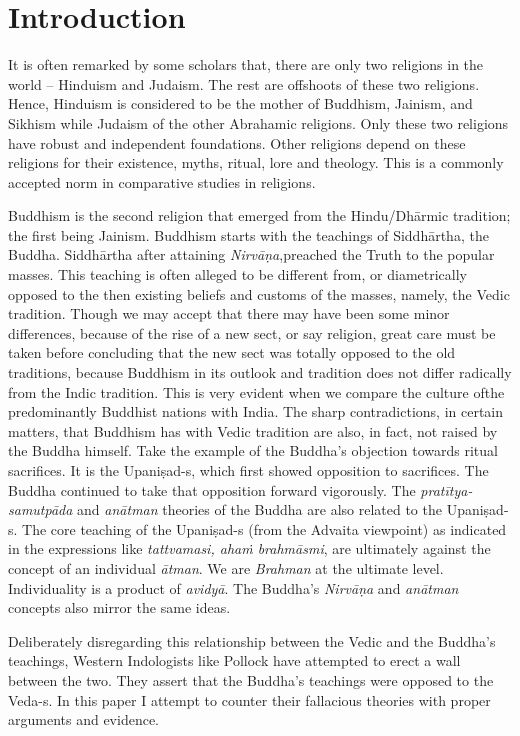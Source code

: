 \section*{Introduction}

It is often remarked by some scholars that, there are only two religions in the world – Hinduism and Judaism. The rest are offshoots of these two religions. Hence, Hinduism is considered to be the mother of Buddhism, Jainism, and Sikhism while Judaism of the other Abrahamic religions. Only these two religions have robust and independent foundations. Other religions depend on these religions for their existence, myths, ritual, lore and theology. This is a commonly accepted norm in comparative studies in religions.

Buddhism is the second religion that emerged from the Hindu/Dhārmic tradition; the first being Jainism. Buddhism starts with the teachings of Siddhārtha, the Buddha. Siddhārtha after attaining \textit{Nirvāṇa},\break preached the Truth to the popular masses. This teaching is often alleged to be different from, or diametrically opposed to the then existing beliefs and customs of the masses, namely, the Vedic tradition. Though we may accept that there may have been some minor differences, because of the rise of a new sect, or say religion, great care must be taken before concluding that the new sect was totally opposed to the old traditions, because Buddhism in its outlook and tradition does not differ radically from the Indic tradition. This is very evident when we compare the culture ofthe predominantly Buddhist nations with India. The sharp contradictions, in certain matters, that Buddhism has with Vedic tradition are also, in fact, not raised by the Buddha himself. Take the example of the Buddha’s objection towards ritual sacrifices. It is the Upaniṣad-s, which first showed opposition to sacrifices. The Buddha continued to take that opposition forward vigorously. The \textit{pratītya-samutpāda} and \textit{anātman} theories of the Buddha are also related to the Upaniṣad-s. The core teaching of the Upaniṣad-s (from the Advaita viewpoint) as indicated in the expressions like \textit{tattvamasi, ahaṁ brahmāsmi}, are ultimately against the concept of an individual \textit{ātman}. We are \textit{Brahman} at the ultimate level. Individuality is a product of \textit{avidyā}. The Buddha’s \textit{Nirvāṇa} and \textit{anātman} concepts also mirror the same ideas.

Deliberately disregarding this relationship between the Vedic and the Buddha’s teachings, Western Indologists like Pollock have attempted to erect a wall between the two. They assert that the Buddha’s teachings were opposed to the Veda-s. In this paper I attempt to counter their fallacious theories with proper arguments and evidence.

